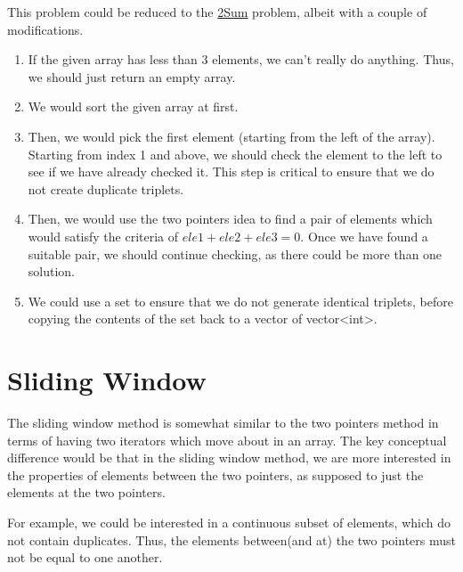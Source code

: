 \documentclass[11pt]{article}
\begin{document}
This problem could be reduced to the \href{https://leetcode.com/problems/two-sum/}{2Sum}
problem, albeit with a couple of modifications.
\begin{enumerate}
 \item{
             If the given array has less than 3 elements, we can't really do anything. Thus, we should just return an empty array.
             
       }
 \item{
             We would sort the given array at first.
       }
 \item{
             Then, we would pick the first element (starting from the left of the array).
             Starting from index 1 and above, we should check the element to the left to see if we have already checked it. This step is critical to ensure that we do not create duplicate triplets.
       }
 \item {
       Then, we would use the two pointers idea to find a pair of elements which would satisfy the criteria of $ele1+ele2+ele3=0$. Once we have found a suitable pair, we should continue checking, as there could be more than one solution.
       
       }
       \item{
                   We could use a set to ensure that we do not generate identical triplets, before copying the contents of the set back to a vector of vector<int>.
             }
\end{enumerate}

\section{Sliding Window}
The sliding window method is somewhat similar to the two pointers method in terms of having two iterators which move about in an array. The key conceptual difference would be that in the sliding window method, we are more interested in the properties of elements between the two pointers, as supposed to just the elements at the two pointers.

For example, we could be interested in a continuous subset of elements, which do not contain duplicates. Thus, the elements between(and at) the two pointers must not be equal to one another.
\end{document}
